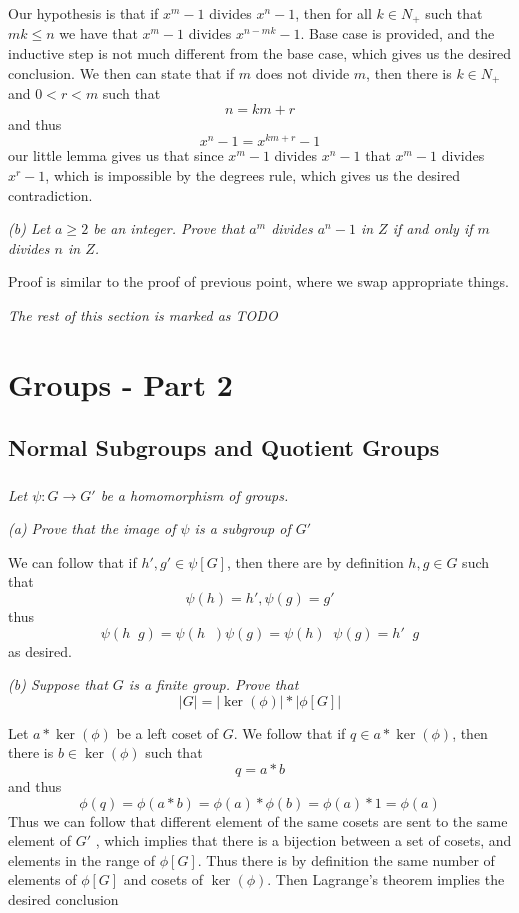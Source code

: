 \documentclass[11pt,oneside,titlepage]{book}
\DeclareMathOperator \inv {^{-1}}
\begin{document}
Our hypothesis is that if $x^m - 1$ divides $x^n - 1$, then for all $k
\in N_+$ such that $mk \leq n$ we have that $x^m - 1$ divides $x^{n -
mk} - 1$. Base case is provided, and the inductive step is not much
different from the base case, which gives us the desired conclusion. We
then can state that if $m$ does not divide $m$, then there is $k \in
N_+$ and $0 < r < m$ such that
$$n = km + r$$
and thus
$$x^{n} - 1 = x^{km + r} - 1$$
our little lemma gives us that since $x^m - 1$ divides $x^n - 1$
that $x^m - 1$ divides $x^{r} - 1$, which is impossible by the
degrees rule, which gives us the desired contradiction.

\textit{(b) Let $a \geq 2$ be an integer. Prove that $a^m$ divides
  $a^n - 1$ in $Z$ if and only if $m$ divides $n$ in $Z$.}

Proof is similar to the proof of previous point, where we swap
appropriate things.

\textit{The rest of this section is marked as TODO}

\chapter{Groups - Part  2}

\section{Normal Subgroups and Quotient Groups}

\subsection{}

\textit{Let $\psi: G \to G'$ be a homomorphism of groups.}

\textit{(a) Prove that the image of $\psi$ is a subgroup of $G'$}

We can follow that if $h', g' \in \psi[G]$, then there are by
definition $h, g \in G$ such that
$$\psi(h) = h', \psi(g) = g'$$
thus
$$\psi(h\inv g) = \psi(h\inv) \psi(g) = \psi(h)\inv \psi(g) = h'\inv g$$
as desired.

\textit{(b) Suppose that $G$ is a finite group. Prove that
  $$|G| = |\ker(\phi)| * |\phi[G]|$$}

Let $a * \ker(\phi)$ be a left coset of $G$. We follow that if $q \in
a * \ker(\phi)$, then there is $b \in \ker(\phi)$ such that
$$q = a * b$$
and thus
$$\phi(q) = \phi(a * b) = \phi(a) * \phi(b) = \phi(a) * 1 = \phi(a)$$
Thus we can follow that different element of the same cosets are sent
to the same element of $G'$ , which implies that there is a bijection
between a set of cosets, and elements in the range of $\phi[G]$.
Thus there is by definition the same number of elements of $\phi[G]$
and cosets of $\ker(\phi)$. Then Lagrange's theorem implies the desired
conclusion
\end{document}
